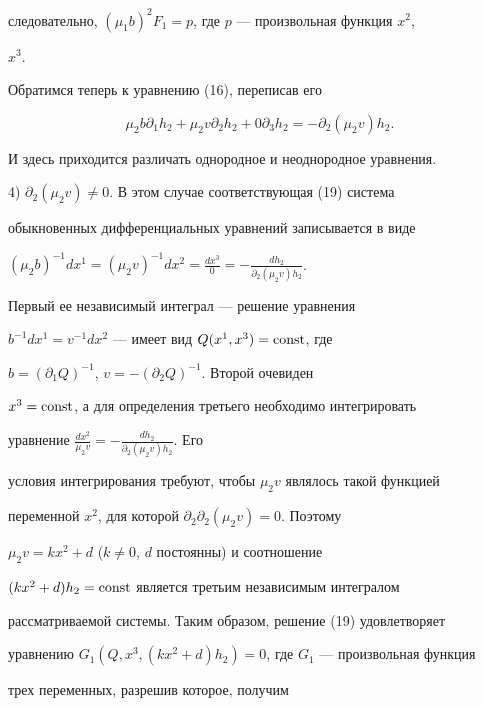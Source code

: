 следовательно, $(\mu_1b)^2F_1=p$, где $p$ --- произвольная функция $x^2$, 


$x^3$. 


 


Обратимся теперь к уравнению (16), переписав его 


\begin{equation} 


\mu_2b\partial_1h_2+\mu_2v\partial_2h_2+0\partial_3h_2=- 


\partial_2(\mu_2v)h_2. 


\end{equation} 


И здесь приходится различать однородное и неоднородное уравнения. 


 


4) $\partial_2(\mu_2v)\ne0$. В этом случае соответствующая (19) система 


обыкновенных дифференциальных уравнений записывается в виде 


$(\mu_2b)^{-1} dx^1= (\mu_2v)^{-1} dx^2= \frac{dx^3}{0}= 


-\frac{dh_2}{\partial_2(\mu_2v)h_2}$. 


 


Первый ее независимый интеграл --- решение уравнения 


$b^{-1}dx^1=v^{-1}dx^2$ --- имеет вид $Q(x^1,x^3)=\operatorname{const}$, где 


$b=(\partial_1Q)^{-1}$, $v=-(\partial_2Q)^{-1}$. Второй очевиден 


$x^3=\operatorname{const}$, а для определения третьего необходимо интегрировать 


уравнение $\frac{dx^2}{\mu_2v}= -\frac{dh_2}{\partial_2(\mu_2v)h_2}$. Его 


условия интегрирования требуют, чтобы $\mu_2v$ являлось такой функцией 


переменной $x^2$, для которой $\partial_2\partial_2(\mu_2v)=0$. Поэтому 


$\mu_2v=kx^2+d$ ($k\ne0$, $d$ постоянны) и соотношение 


$(kx^2+d)h_2=\operatorname{const}$ является третьим независимым интегралом 


рассматриваемой системы. Таким образом, решение (19) удовлетворяет 


уравнению $G_1(Q,x^3,(kx^2+d)h_2)=0$, где $G_1$ --- произвольная функция 


трех переменных, разрешив которое, получим 


